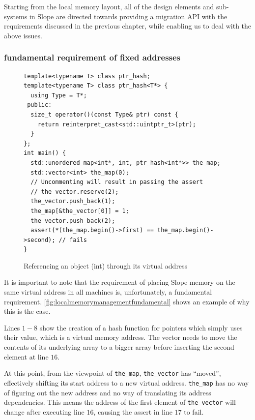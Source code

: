 Starting from the local memory layout, all of the design elements and
sub-systems in Slope are directed towards providing a migration API with the
requirements discussed in the previous chapter, while enabling us to deal with
the above
issues.


\subsubsection{fundamental requirement of fixed addresses}
\label{sec:fixedfundamental}
\begin{figure}[tp]
\begin{lstlisting}
template<typename T> class ptr_hash;
template<typename T> class ptr_hash<T*> {
  using Type = T*;
 public:
  size_t operator()(const Type& ptr) const {
    return reinterpret_cast<std::uintptr_t>(ptr);
  }
};
int main() {
  std::unordered_map<int*, int, ptr_hash<int*>> the_map;
  std::vector<int> the_map(0);
  // Uncommenting will result in passing the assert
  // the_vector.reserve(2);
  the_vector.push_back(1);
  the_map[&the_vector[0]] = 1;
  the_vector.push_back(2);
  assert(*(the_map.begin()->first) == the_map.begin()->second); // fails
}
\end{lstlisting}
\caption{
    Referencing an object (int) through its virtual address
}
\label{fig:localmemorymanagementfundamental}
\end{figure}




It is important to note that the requirement of
placing Slope memory on the same virtual address in all machines is,
unfortunately, a fundamental requirement. \autoref{fig:localmemorymanagementfundamental}
shows an example of why this is the case.

Lines $1-8$ show the creation of a hash
    function for pointers which simply uses their value, which is a virtual
    memory address. The vector needs to move the contents of its underlying
    array to a bigger array before inserting the second element at line $16$.

    At this point, from the viewpoint of
    \texttt{the\_map}, \texttt{the\_vector} has ``moved'', effectively shifting its start
    address to a new virtual address. \texttt{the\_map} has no way of figuring out
    the new address and no way of translating its address dependencies.
    This means the address of the first element of \texttt{the\_vector} will
    change after executing line $16$, causing the assert in line $17$ to
    fail.

